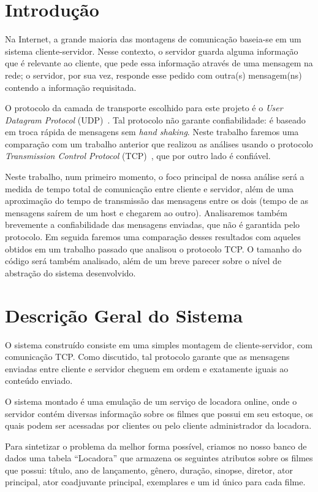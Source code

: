 \documentclass[12pt,a4paper]{article}
\begin{document}
\section{Introdução}
Na Internet, a grande maioria das montagens de comunicação baseia-se em um sistema cliente-servidor. Nesse contexto, o servidor guarda alguma informação que é relevante ao cliente, que pede essa informação através de uma mensagem na rede; o servidor, por sua vez, responde esse pedido com outra(s) mensagem(ns) contendo a informação requisitada.

O protocolo da camada de transporte escolhido para este projeto é o {\it User Datagram Protocol} (UDP)~\cite{postel1980user}. Tal protocolo não garante confiabilidade: é baseado em troca rápida de mensagens sem {\it hand shaking}. Neste trabalho faremos uma comparação com um trabalho anterior que realizou as análises usando o protocolo {\it Transmission Control Protocol} (TCP)~\cite{postel1981transmission}, que por outro lado é confiável.

Neste trabalho, num primeiro momento, o foco principal de nossa análise será a medida de tempo total de comunicação entre cliente e servidor, além de uma aproximação do tempo de transmissão das mensagens entre os dois (tempo de as mensagens saírem de um host e chegarem ao outro). Analisaremos também brevemente a confiabilidade das mensagens enviadas, que não é garantida pelo protocolo. Em seguida faremos uma comparação desses resultados com aqueles obtidos em um trabalho passado que analisou o protocolo TCP. O tamanho do código será também analisado, além de um breve parecer sobre o nível de abstração do sistema desenvolvido.

\section{Descrição Geral do Sistema}

O sistema construído consiste em uma simples montagem de cliente-servidor, com comunicação TCP. Como discutido, tal protocolo garante que as mensagens enviadas entre cliente e servidor cheguem em ordem e exatamente iguais ao conteúdo enviado.

    O sistema montado é uma emulação de um serviço de locadora online, onde o servidor contém diversas informação sobre os filmes que possui em seu estoque, os quais podem ser acessadas por clientes ou pelo cliente administrador da locadora. 
    
    Para sintetizar o problema da melhor forma possível, criamos no nosso banco de dados uma tabela “Locadora” que armazena os seguintes atributos sobre os filmes que possui: título, ano de lançamento, gênero, duração, sinopse, diretor, ator principal, ator coadjuvante principal, exemplares e um id único para cada filme. 
    
\end{document}
